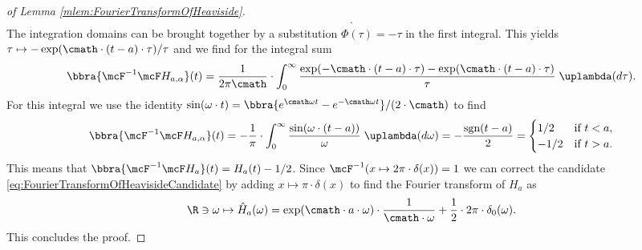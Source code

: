 \begin{proof}[of Lemma \ref{mlem:FourierTransformOfHeaviside}]
\begin{multline}
{        }.\label{eq:FourierTransformOfHeavisideCandidate}\tag{C}
    \end{multline}
    The integration domains can be brought together by a substitution $\Phi(\tau) = -\tau$ in the first integral. This yields $\tau\mapsto -\exp(\cmath\cdot (t - a)\cdot\tau)/\tau$ and we find for the integral sum
    \[
        \bbra{\mcF^{-1}\mcF H_{a,\alpha}}(t) = \frac{1}{2\pi\cmath}\cdot\int_{0}^\infty\frac{\exp(-\cmath\cdot (t - a)\cdot\tau) - \exp(\cmath\cdot (t - a)\cdot\tau)}{\tau}\;\uplambda(d\tau).
    \]
    For this integral we use the identity $\sin(\omega\cdot t) = \bbra{e^{\cmath\omega t} - e^{-\cmath\omega t}}/(2\cdot\cmath)$ to find
    \[
        \bbra{\mcF^{-1}\mcF H_{a,\alpha}}(t) = -\frac{1}{\pi}\cdot\int_{0}^\infty\frac{\sin(\omega\cdot(t - a))}{\omega}\;\uplambda(d\omega) = -\frac{\text{sgn}(t - a)}{2} = \begin{cases}
            1/2 & \text{if } t < a, \\
            -1/2 & \text{if } t > a.
        \end{cases}
    \]
    This means that $\bbra{\mcF^{-1}\mcF H_{a}}(t) = H_a(t) - 1/2$. Since $\mcF^{-1}(x\mapsto 2\pi\cdot\delta(x)) = 1$ we can correct the candidate \eqref{eq:FourierTransformOfHeavisideCandidate} by adding $x\mapsto \pi\cdot\delta(x)$ to find the Fourier transform of $H_a$ as
    \[
        \R\ni\omega\mapsto\hat H_a(\omega) = \exp(\cmath\cdot a\cdot \omega)\cdot\frac{1}{\cmath\cdot\omega} + \frac{1}{2}\cdot 2\pi\cdot\delta_0(\omega).
    \]
    This concludes the proof.
\end{proof}